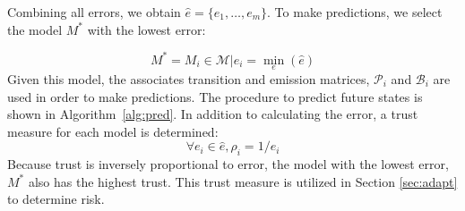 \documentclass[letterpaper, 10 pt, conference]{ieeeconf}  %
\newcommand\NB[1]{$\spadesuit$\footnote{NB: #1}}
\begin{document}
Combining all errors, we obtain $\hat{e} = \{e_1,\ldots,e_m\}$. To make predictions, we select the model $M^*$ with the lowest error: %

\begin{equation}
    M^*=M_i\in\mathcal{M}\vert e_i = \min_e(\hat{e})
\end{equation}
  Given this model, the associates transition and emission matrices, $\mathcal{P}_{i}$ and $\mathcal{B}_{i}$ are used in order to make predictions. The procedure to predict future states is shown in Algorithm~\ref{alg:pred}. In addition to calculating the error, a trust measure for each model is determined:
  \begin{equation}
      \forall e_i \in\hat{e}, \rho_i = 1/e_i
 \end{equation}
 Because trust is inversely proportional to error, the model with the lowest error, $M^*$ also has the highest trust. This trust measure is utilized in Section \ref{sec:adapt} to determine risk.
  
  


\end{document}
